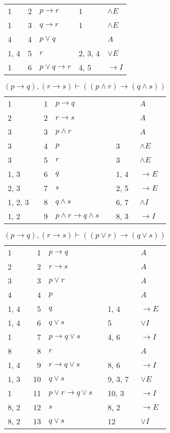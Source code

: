 \documentclass{article}
\begin{document}
\begin{table}[htbp]
\begin{tabular}{lrlll}
{1} & 2 & $p→r$ & {1} & $∧E$ \\
{1} & 3 & $q→r$ & {1} & $∧E$ \\
{4} & 4 & $p∨q$ & {} & $A$ \\
{1, 4} & 5 & $r$ & {2, 3, 4} & $∨E$ \\
{1} & 6 & $p∨q→r$ & {4, 5} & $→I$ \\
\end{tabular}
\end{table}\begin{table}[htbp]\caption*{$(p→q),(r→s) ⊢ ((p∧r)→(q∧s))$}\centering\begin{tabular}{lrlll}
{1} & 1 & $p→q$ & {} & $A$ \\
{2} & 2 & $r→s$ & {} & $A$ \\
{3} & 3 & $p∧r$ & {} & $A$ \\
{3} & 4 & $p$ & {3} & $∧E$ \\
{3} & 5 & $r$ & {3} & $∧E$ \\
{1, 3} & 6 & $q$ & {1, 4} & $→E$ \\
{2, 3} & 7 & $s$ & {2, 5} & $→E$ \\
{1, 2, 3} & 8 & $q∧s$ & {6, 7} & $∧I$ \\
{1, 2} & 9 & $p∧r→q∧s$ & {8, 3} & $→I$ \\
\end{tabular}
\end{table}\begin{table}[htbp]\caption*{$(p→q),(r→s) ⊢ ((p∨r)→(q∨s))$}\centering\begin{tabular}{lrlll}
{1} & 1 & $p→q$ & {} & $A$ \\
{2} & 2 & $r→s$ & {} & $A$ \\
{3} & 3 & $p∨r$ & {} & $A$ \\
{4} & 4 & $p$ & {} & $A$ \\
{1, 4} & 5 & $q$ & {1, 4} & $→E$ \\
{1, 4} & 6 & $q∨s$ & {5} & $∨I$ \\
{1} & 7 & $p→q∨s$ & {4, 6} & $→I$ \\
{8} & 8 & $r$ & {} & $A$ \\
{1, 4} & 9 & $r→q∨s$ & {8, 6} & $→I$ \\
{1, 3} & 10 & $q∨s$ & {9, 3, 7} & $∨E$ \\
{1} & 11 & $p∨r→q∨s$ & {10, 3} & $→I$ \\
{8, 2} & 12 & $s$ & {8, 2} & $→E$ \\
{8, 2} & 13 & $q∨s$ & {12} & $∨I$ \\
\end{tabular}

\end{table}
\end{document}
